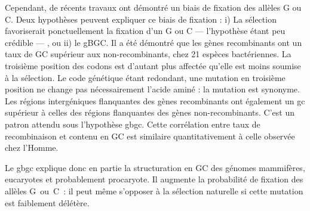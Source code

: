 \documentclass[11pt, oneside]{scrartcl}
\begin{document}
Cependant, de récents travaux ont démontré un biais de fixation des allèles G ou
C\cite{hildebrand_evidence_2010, hershberg_evidence_2010}. Deux hypothèses
peuvent expliquer ce biais de fixation : i) La sélection favoriserait
ponctuellement la fixation d'un G ou C --- l'hypothèse étant peu crédible --- ,
ou ii) le gBGC. Il a été démontré que les gènes recombinants ont un taux de GC
supérieur aux non-recombinants\cite{lassalle_gc-content_2015}, chez 21 espèces
bactériennes. La troisième position des codons est d'autant plus affectée
qu'elle est moins soumise à la sélection. Le code génétique étant redondant, une
mutation en troisième position ne change pas nécessairement l'acide aminé : la
mutation est synonyme. Les régions intergéniques flanquantes des gènes
recombinants ont également un \ac{gc} supérieur à celles des régions flanquantes
des gènes non-recombinants. C'est un patron attendu sous l'hypothèse \ac{gbgc}.
Cette corrélation entre taux de recombinaison et contenu en GC est similaire
quantitativement à celle observée chez l'Homme\cite{lassalle_gc-content_2015}.

%
%

\begin{transition}
  Le \ac{gbgc} explique donc en partie la structuration en GC des génomes
  mammifères, eucaryotes et probablement procaryote. Il augmente la probabilité
  de fixation des allèles G ou C : il peut même s'opposer à la sélection
  naturelle si cette mutation est faiblement délétère.  
\end{transition}
\end{document}

